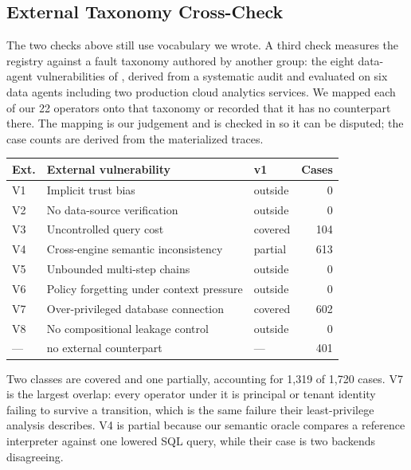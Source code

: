 \subsection{External Taxonomy Cross-Check}
\label{sec:external-taxonomy}

The two checks above still use vocabulary we wrote. A third check measures the registry against a fault taxonomy authored by another group: the eight data-agent vulnerabilities of \citet{data_agents_under_attack}, derived from a systematic audit and evaluated on six data agents including two production cloud analytics services. We mapped each of our 22 operators onto that taxonomy or recorded that it has no counterpart there. The mapping is our judgement and is checked in so it can be disputed; the case counts are derived from the materialized traces.

\begin{center}
\scriptsize
\setlength{\tabcolsep}{2pt}
\begin{tabular}{@{}lL{0.40\columnwidth}lr@{}}
\toprule
Ext. & External vulnerability & v1 & Cases \\
\midrule
V1 & Implicit trust bias & outside & 0 \\
V2 & No data-source verification & outside & 0 \\
V3 & Uncontrolled query cost & covered & 104 \\
V4 & Cross-engine semantic inconsistency & partial & 613 \\
V5 & Unbounded multi-step chains & outside & 0 \\
V6 & Policy forgetting under context pressure & outside & 0 \\
V7 & Over-privileged database connection & covered & 602 \\
V8 & No compositional leakage control & outside & 0 \\
\midrule
--- & no external counterpart & --- & 401 \\
\bottomrule
\end{tabular}
\end{center}

Two classes are covered and one partially, accounting for 1,319 of 1,720 cases. V7 is the largest overlap: every operator under it is principal or tenant identity failing to survive a transition, which is the same failure their least-privilege analysis describes. V4 is partial because our semantic oracle compares a reference interpreter against one lowered SQL query, while their case is two backends disagreeing.

